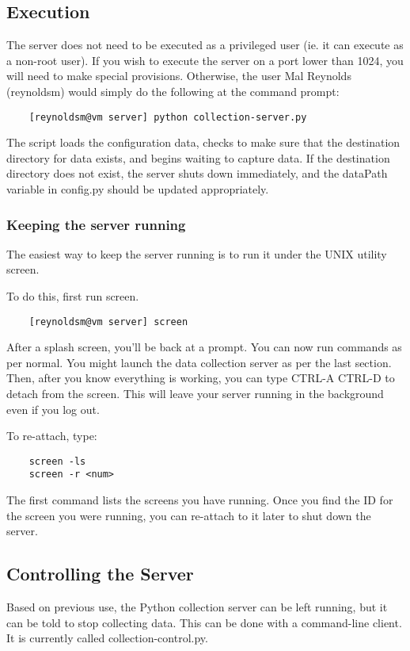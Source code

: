 \documentclass[12pt]{article}
\begin{document}
\subsection{Execution}
The server does not need to be executed as a privileged user (ie. it can execute as a non-root user). If you wish to execute the server on a port lower than 1024, you will need to make special provisions. Otherwise, the user Mal Reynolds (reynoldsm) would simply do the following at the command prompt:
\begin{verbatim}
	[reynoldsm@vm server] python collection-server.py
\end{verbatim}

The script loads the configuration data, checks to make sure that the destination directory for data exists, and begins waiting to capture data. If the destination directory does not exist, the server shuts down immediately, and the {\code dataPath} variable in {\code config.py} should be updated appropriately.

\subsubsection{Keeping the server running}
The easiest way to keep the server running is to run it under the UNIX utility {\code screen}. 

To do this, first run {\code screen}.

\begin{verbatim}
	[reynoldsm@vm server] screen
\end{verbatim}

After a splash screen, you'll be back at a prompt. You can now run commands as per normal. You might launch the data collection server as per the last section. Then, after you know everything is working, you can type {\code CTRL-A CTRL-D} to detach from the {\code screen}. This will leave your server running in the background even if you log out.

To re-attach, type:

\begin{verbatim}
	screen -ls
	screen -r <num>
\end{verbatim}

The first command lists the screens you have running. Once you find the ID for the screen you were running, you can re-attach to it later to shut down the server.

\subsection{Controlling the Server}
Based on previous use, the Python collection server can be left running, but it can be told to stop collecting data. This can be done with a command-line client. It is currently called {\code collection-control.py}.
\end{document}
